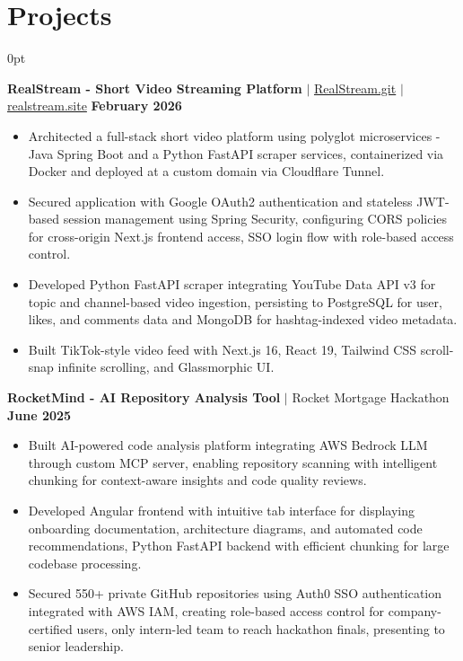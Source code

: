 \documentclass[letterpaper,10pt]{article}
\newlength{\contentindent}
\newcommand{\sectioncontent}[1]{%
  \begin{adjustwidth}{\contentindent}{0pt}%
  #1%
  \end{adjustwidth}%
}
\begin{document}
\section{Projects}
\sectioncontent{

\textbf{RealStream - Short Video Streaming Platform} $|$ \href{https://github.com/Saurav-Kalaskar/RealStream.git}{RealStream.git} $|$ \href{https://realstream.site/}{realstream.site} \hfill \textbf{February 2026}
\begin{itemize}
    \item Architected a full-stack short video platform using polyglot microservices - Java Spring Boot and a Python FastAPI scraper services, containerized via Docker and deployed at a custom domain via Cloudflare Tunnel.
    \item Secured application with Google OAuth2 authentication and stateless JWT-based session management using Spring Security, configuring CORS policies for cross-origin Next.js frontend access, SSO login flow with role-based access control.
    \item Developed Python FastAPI scraper integrating YouTube Data API v3 for topic and channel-based video ingestion, persisting to PostgreSQL for user, likes, and comments data and MongoDB for hashtag-indexed video metadata.
    \item Built TikTok-style video feed with Next.js 16, React 19, Tailwind CSS scroll-snap infinite scrolling, and Glassmorphic UI.
\end{itemize}

\textbf{RocketMind - AI Repository Analysis Tool} $|$ Rocket Mortgage Hackathon \hfill \textbf{June 2025}
\begin{itemize}
    \item Built AI-powered code analysis platform integrating AWS Bedrock LLM through custom MCP server, enabling repository scanning with intelligent chunking for context-aware insights and code quality reviews.
    \item Developed Angular frontend with intuitive tab interface for displaying onboarding documentation, architecture diagrams, and automated code recommendations, Python FastAPI backend with efficient chunking for large codebase processing.
    \item Secured 550+ private GitHub repositories using Auth0 SSO authentication integrated with AWS IAM, creating role-based access control for company-certified users, only intern-led team to reach hackathon finals, presenting to senior leadership.
\end{itemize}


}
\end{document}
